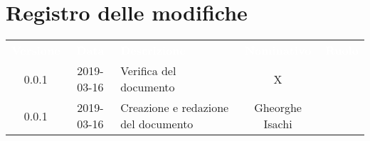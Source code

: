 \section*{Registro delle modifiche}
{
	\renewcommand{\arraystretch}{1.5}
	\centering
	\begin{longtable}{ c c  C{4cm}  c  c }
		
		\textcolor{white}{\textbf{Versione}} & \textcolor{white}{\textbf{Data}} & \textcolor{white}{\textbf{Descrizione}} & \textcolor{white}{\textbf{Nominativo}} & \textcolor{white}{\textbf{Ruolo}}\\
		
		0.0.1 & 2019-03-16 & Verifica del documento & X & \ver{} \\
	
		0.0.1 & 2019-03-16 & Creazione e redazione del documento & Gheorghe Isachi & \reda{}\\
		
	\end{longtable}

}